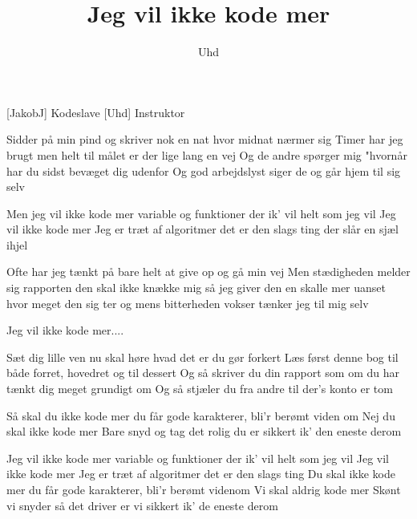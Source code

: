 \documentclass[a4paper,11pt]{article}
\title{Jeg vil ikke kode mer}
\author{Uhd}
\begin{document}
\maketitle

\begin{roles}
[JakobJ] Kodeslave
[Uhd] Instruktor
\end{roles}

\begin{props}
\end{props}
 
  
\begin{song}

Sidder på min pind og skriver
nok en nat hvor midnat nærmer sig
Timer har jeg brugt
men helt til målet er der lige lang en vej
Og de andre spørger mig "hvornår
har du sidst bevæget dig udenfor
Og god arbejdslyst siger de og går hjem til sig selv

Men jeg vil ikke kode mer
variable og funktioner der ik' vil helt som jeg vil
Jeg vil ikke kode mer
Jeg er træt af algoritmer
det er den slags ting der slår en sjæl ihjel

Ofte har jeg tænkt på bare
helt at give op og gå min vej
Men stædigheden melder sig
rapporten den skal ikke knække mig
så jeg giver den en skalle mer
uanset hvor meget den sig ter
og mens bitterheden vokser tænker jeg til mig selv

Jeg vil ikke kode mer....


 Sæt dig lille ven
nu skal høre hvad det er du gør forkert
Læs først denne bog 
til både forret, hovedret og til dessert
Og så skriver du din rapport som om
du har tænkt dig meget grundigt om
Og så stjæler du fra andre til der's konto er tom

Så skal du ikke kode mer
du får gode karakterer, bli'r berømt viden om
Nej du skal ikke kode mer
Bare snyd og tag det rolig
du er sikkert ik' den eneste derom


 Jeg vil ikke kode mer
variable og funktioner der ik' vil helt som jeg vil
Jeg vil ikke kode mer
Jeg er træt af algoritmer
det er den slags ting
 Du skal ikke kode mer
du får gode karakterer, bli'r berømt videnom
 Vi skal aldrig kode mer
Skønt vi snyder så det driver
er vi sikkert ik' de eneste derom


\end{song}
\end{document}
